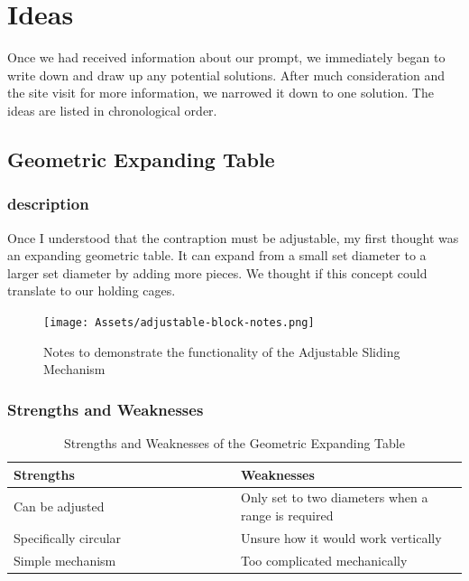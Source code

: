 \documentclass[a4paper,10pt]{article}
\begin{document}


\section{Ideas}
Once we had received information about our prompt, we immediately began to write down and draw up any potential solutions. After much consideration and the site visit for more information, we narrowed it down to one solution. The ideas are listed in chronological order.

\subsection{Geometric Expanding Table}

\subsubsection{description}

Once I understood that the contraption must be adjustable, my first thought was an expanding geometric table. It can expand from a small set diameter to a larger set diameter by adding more pieces. We thought if this concept could translate to our holding cages.

\begin{figure}[H]
  \centering
  \texttt{[image: Assets/adjustable-block-notes.png]}
  \caption{Notes to demonstrate the functionality of the Adjustable Sliding Mechanism}
  \label{fig:adjustable-block-notes}
\end{figure}

\subsubsection{Strengths and Weaknesses}

\begin{table}[h]
  \centering
  \begin{tabular}{p{0.5\linewidth} | p{0.5\linewidth}}
    Strengths                                              & Weaknesses \\ \hline
    \textbullet{} Can be adjusted                          & \textbullet{} Only set to two diameters when a range is required \\
    \textbullet{} Specifically circular                    & \textbullet{} Unsure how it would work vertically \\
    \textbullet{} Simple mechanism                         & \textbullet{} Too complicated mechanically \\
  \end{tabular}
  \caption{Strengths and Weaknesses of the Geometric Expanding Table}
  \label{table:geometric-expanding-table-pros-cons}
\end{table}
\end{document}
